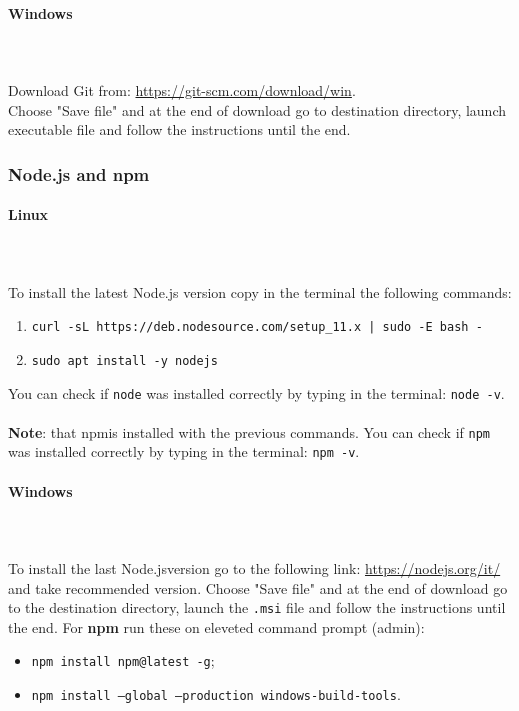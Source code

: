 \paragraph{Windows} \mbox{} \\ \mbox{} \\
Download Git from: \url{https://git-scm.com/download/win}. \\
Choose "Save file" and at the end of download go to destination directory, launch executable file and follow the instructions until the end.

\subsubsection{Node.js and npm}
\paragraph{Linux} \mbox{} \\ \mbox{} \\
To install the latest Node.js version copy in the terminal the following commands:
\begin{enumerate}
	\item \texttt{curl -sL https://deb.nodesource.com/setup\_11.x | sudo -E bash -}
	\item \texttt{sudo apt install -y nodejs}
\end{enumerate} 
You can check if \texttt{node} was installed correctly by typing in the 
terminal: \texttt{node -v}.\\ \\
\textbf{Note}: that npm\glosp is installed with the previous commands. You can check if \texttt{npm} was installed correctly by typing in the 
terminal: \texttt{npm -v}.\\
\paragraph{Windows} \mbox{} \\ \mbox{} \\
To install the last Node.js\glosp version go to the following link: \url{https://nodejs.org/it/} and take recommended version.
Choose "Save file" and at the end of download go to the destination directory, launch the \texttt{.msi} file and follow the instructions until the end.
For \textbf{npm} run these on eleveted command prompt (admin):
\begin{itemize}
	\item \texttt{npm install npm@latest -g};
	\item \texttt{npm install ---global ---production windows-build-tools}.
\end{itemize}

